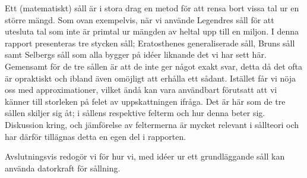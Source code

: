 Ett (matematiskt) såll är i stora drag en metod för att rensa bort vissa tal ur en större mängd.
Som ovan exempelvis, när vi använde Legendres såll för att utesluta tal som inte är primtal ur mängden av heltal upp till en miljon.
I denna rapport presenteras tre stycken såll;
Eratosthenes generaliserade såll, Bruns såll samt Selbergs såll som alla bygger på idéer liknande det vi har sett här.
Gemensamt för de tre sållen är att de inte ger något exakt svar, detta då det ofta är opraktiskt och ibland även omöjligt att erhålla ett sådant.
Istället får vi nöja oss med approximationer, vilket ändå kan vara användbart förutsatt att vi känner till storleken på felet av uppskattningen ifråga.
Det är här som de tre sållen skiljer sig åt; i sållens respektive felterm och hur denna beter sig.
Diskussion kring, och jämförelse av feltermerna är mycket relevant i sållteori och har därför tillägnas detta en egen del i rapporten.


Avslutningsvis redogör vi för hur vi, med idéer ur ett grundläggande såll kan använda datorkraft för sållning.












